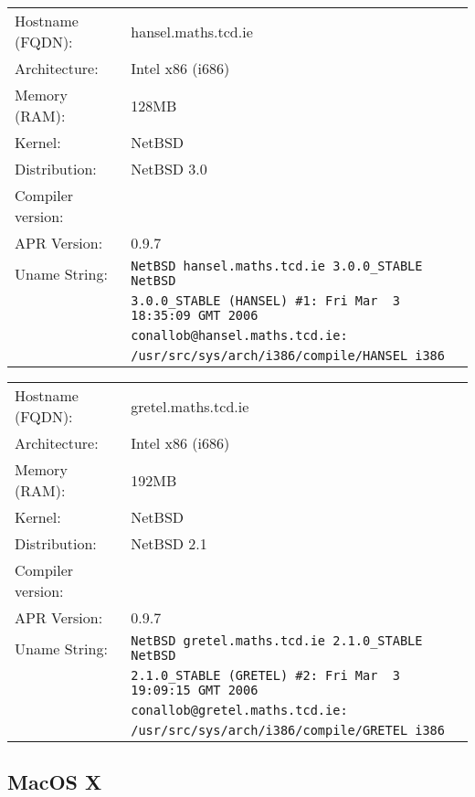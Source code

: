 \begin{tabular}{ll}
Hostname (FQDN):	&	hansel.maths.tcd.ie 				\\
Architecture:		&	Intel x86 (i686)					\\
Memory (RAM):		&	128MB									\\
Kernel:				&	NetBSD								\\
Distribution:		&	NetBSD 3.0							\\
Compiler version:	&											\\
APR Version:		&	0.9.7									\\
Uname String:		& \verb!NetBSD hansel.maths.tcd.ie 3.0.0_STABLE NetBSD!\\
						& \verb!3.0.0_STABLE (HANSEL) #1: Fri Mar  3 18:35:09 GMT 2006!\\
						& \verb!conallob@hansel.maths.tcd.ie:!\\
						& \verb!/usr/src/sys/arch/i386/compile/HANSEL i386!\\
\end{tabular}

\begin{tabular}{ll}
Hostname (FQDN):	&	gretel.maths.tcd.ie 				\\
Architecture:		&	Intel x86 (i686)					\\
Memory (RAM):		&	192MB									\\
Kernel:				&	NetBSD								\\
Distribution:		&	NetBSD 2.1 							\\
Compiler version:	&											\\
APR Version:		&	0.9.7									\\
Uname String:		& \verb!NetBSD gretel.maths.tcd.ie 2.1.0_STABLE NetBSD!\\
						& \verb!2.1.0_STABLE (GRETEL) #2: Fri Mar  3 19:09:15 GMT 2006! \\
						& \verb!conallob@gretel.maths.tcd.ie:!\\
						& \verb!/usr/src/sys/arch/i386/compile/GRETEL i386! \\
\end{tabular}

\subsection{MacOS X}

